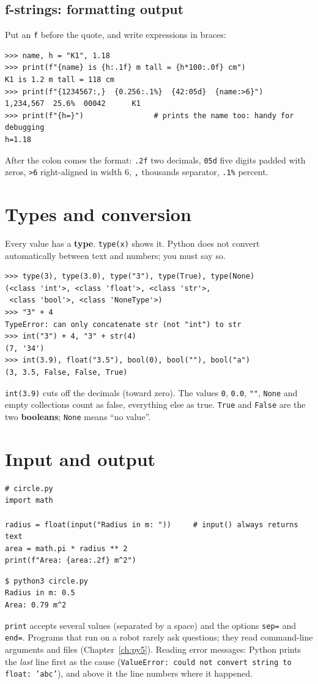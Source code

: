 \subsection*{f-strings: formatting output}
Put an \texttt{f} before the quote, and write expressions in braces:
\begin{verbatim}
>>> name, h = "K1", 1.18
>>> print(f"{name} is {h:.1f} m tall = {h*100:.0f} cm")
K1 is 1.2 m tall = 118 cm
>>> print(f"{1234567:,}  {0.256:.1%}  {42:05d}  {name:>6}")
1,234,567  25.6%  00042      K1
>>> print(f"{h=}")                # prints the name too: handy for debugging
h=1.18
\end{verbatim}
After the colon comes the format: \texttt{.2f} two decimals, \texttt{05d} five digits padded with zeros, \texttt{>6} right-aligned in width 6, \texttt{,} thousands separator, \texttt{.1\%} percent.

\section*{Types and conversion}
Every value has a \textbf{type}. \texttt{type(x)} shows it. Python does not convert automatically between text and numbers; you must say so.
\begin{verbatim}
>>> type(3), type(3.0), type("3"), type(True), type(None)
(<class 'int'>, <class 'float'>, <class 'str'>,
 <class 'bool'>, <class 'NoneType'>)
>>> "3" + 4
TypeError: can only concatenate str (not "int") to str
>>> int("3") + 4, "3" + str(4)
(7, '34')
>>> int(3.9), float("3.5"), bool(0), bool(""), bool("a")
(3, 3.5, False, False, True)
\end{verbatim}
\texttt{int(3.9)} cuts off the decimals (toward zero). The values \texttt{0}, \texttt{0.0}, \texttt{""}, \texttt{None} and empty collections count as false, everything else as true. \texttt{True} and \texttt{False} are the two \textbf{booleans}; \texttt{None} means ``no value''.

\section*{Input and output}
\begin{verbatim}
# circle.py
import math

radius = float(input("Radius in m: "))     # input() always returns text
area = math.pi * radius ** 2
print(f"Area: {area:.2f} m^2")
\end{verbatim}
\begin{verbatim}
$ python3 circle.py
Radius in m: 0.5
Area: 0.79 m^2
\end{verbatim}
\texttt{print} accepts several values (separated by a space) and the options \texttt{sep=} and \texttt{end=}. Programs that run on a robot rarely ask questions; they read command-line arguments and files (Chapter~\ref{ch:py5}). Reading error messages: Python prints the \emph{last} line first as the cause (\texttt{ValueError: could not convert string to float: 'abc'}), and above it the line numbers where it happened.

